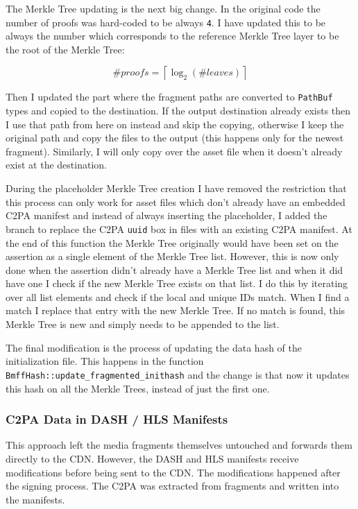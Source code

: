 The Merkle Tree updating is the next big change. In the original code the number of proofs was hard-coded to be always \texttt{4}. I have updated this to be always the number which corresponds to the reference Merkle Tree layer to be the root of the Merkle Tree:

\begin{equation}
    \#proofs = \left\lceil \log_2({\#leaves}) \right\rceil
    \label{eq:proofs}
\end{equation}

Then I updated the part where the fragment paths are converted to \texttt{PathBuf} types and copied to the destination. If the output destination already exists then I use that path from here on instead and skip the copying, otherwise I keep the original path and copy the files to the output (this happens only for the newest fragment). Similarly, I will only copy over the asset file when it doesn't already exist at the destination.

During the placeholder Merkle Tree creation I have removed the restriction that this process can only work for asset files which don't already have an embedded C2PA manifest and instead of always inserting the placeholder, I added the branch to replace the C2PA \texttt{uuid} box in files with an existing C2PA manifest. At the end of this function the Merkle Tree originally would have been set on the assertion as a single element of the Merkle Tree list. However, this is now only done when the assertion didn't already have a Merkle Tree list and when it did have one I check if the new Merkle Tree exists on that list. I do this by iterating over all list elements and check if the local and unique IDs match. When I find a match I replace that entry with the new Merkle Tree. If no match is found, this Merkle Tree is new and simply needs to be appended to the list.

The final modification is the process of updating the data hash of the initialization file. This happens in the function \texttt{BmffHash::update\_fragmented\_inithash} and the change is that now it updates this hash on all the Merkle Trees, instead of just the first one.

\subsubsection{C2PA Data in DASH / HLS Manifests\label{sec:in_manifest}}

This approach left the media fragments themselves untouched and forwards them directly to the CDN. However, the DASH and HLS manifests receive modifications before being sent to the CDN. The modifications happened after the signing process. The C2PA was extracted from fragments and written into the manifests.

